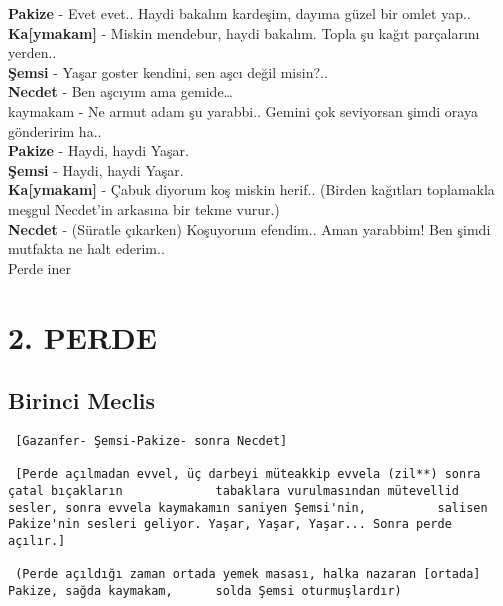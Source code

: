 \documentclass[]{book}
\begin{document}
\textbf{Pakize} - Evet evet.. Haydi bakalım kardeşim, dayıma güzel bir omlet yap..\\
\textbf{Ka{[}ymakam{]}} - Miskin mendebur, haydi bakalım. Topla şu kağıt parçalarını yerden..\\
\textbf{Şemsi} - Yaşar goster kendini, sen aşcı değil misin?..\\
\textbf{Necdet} - Ben aşcıyım ama gemide\ldots{}\\
kaymakam - Ne armut adam şu yarabbi.. Gemini çok seviyorsan şimdi oraya gönderirim ha..\\
\textbf{Pakize} - Haydi, haydi Yaşar.\\
\textbf{Şemsi} - Haydi, haydi Yaşar.\\
\textbf{Ka{[}ymakam{]}} - Çabuk diyorum koş miskin herif.. (Birden kağıtları toplamakla meşgul Necdet'in arkasına bir tekme vurur.)\\
\textbf{Necdet} - (Süratle çıkarken) Koşuyorum efendim.. Aman yarabbim! Ben şimdi mutfakta ne halt ederim..\\

Perde iner

\hypertarget{perde-1}{%
\chapter{2. PERDE}\label{perde-1}}

\hypertarget{birinci-meclis-1}{%
\section{Birinci Meclis}\label{birinci-meclis-1}}

\begin{verbatim}
 [Gazanfer- Şemsi-Pakize- sonra Necdet] 

 [Perde açılmadan evvel, üç darbeyi müteakkip evvela (zil**) sonra çatal bıçakların             tabaklara vurulmasından mütevellid sesler, sonra evvela kaymakamın saniyen Şemsi'nin,          salisen Pakize'nin sesleri geliyor. Yaşar, Yaşar, Yaşar... Sonra perde açılır.]

 (Perde açıldığı zaman ortada yemek masası, halka nazaran [ortada] Pakize, sağda kaymakam,      solda Şemsi oturmuşlardır)
\end{verbatim}
\end{document}
